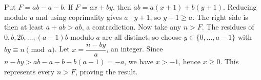 Put $F=ab-a-b$. If $F=ax+by$, then $ab=a(x+1)+b(y+1)$. Reducing modulo $a$ and using coprimality gives $a\mid y+1$, so $y+1\ge a$. The right side is then at least $a+ab>ab$, a contradiction. Now take any $n>F$. The residues of $0,b,2b,\ldots,(a-1)b$ modulo $a$ are all distinct, so choose $y\in\{0,\ldots,a-1\}$ with $by\equiv n\pmod a$. Let $x=\dfrac{n-by}{a}$, an integer. Since $n-by>ab-a-b-b(a-1)=-a$, we have $x>-1$, hence $x\ge0$. This represents every $n>F$, proving the result.
